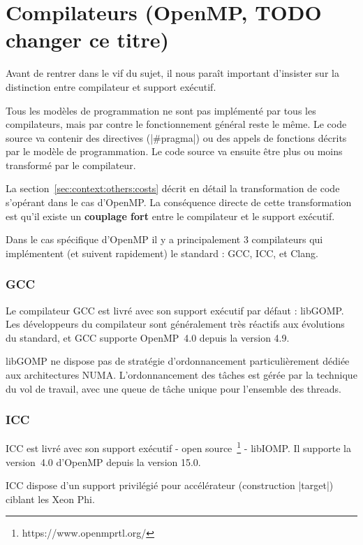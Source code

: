 \section{Compilateurs (OpenMP, TODO changer ce titre)}\label{sec:rw:compilers}


Avant de rentrer dans le vif du sujet, il nous paraît important d'insister sur la distinction entre compilateur et support exécutif.

Tous les modèles de programmation ne sont pas implémenté par tous les compilateurs, mais par contre le fonctionnement général reste le même.
Le code source va contenir des directives (|#pragma|) ou des appels de fonctions décrits par le modèle de programmation. Le code source va ensuite être plus ou moins transformé par le compilateur.

La section~\ref{sec:context:others:costs} décrit en détail la transformation de code s'opérant dans le cas d'OpenMP.
La conséquence directe de cette transformation est qu'il existe un \textbf{couplage fort} entre le compilateur et le support exécutif.

Dans le cas spécifique d'OpenMP il y a principalement 3 compilateurs qui implémentent (et suivent rapidement) le standard : GCC, ICC, et Clang.


\subsubsection{GCC}

Le compilateur GCC est livré avec son support exécutif par défaut : libGOMP.
Les développeurs du compilateur sont généralement très réactifs aux évolutions du standard, et GCC supporte OpenMP~4.0 depuis la version 4.9.

libGOMP ne dispose pas de stratégie d'ordonnancement particulièrement dédiée aux architectures NUMA.
L'ordonnancement des tâches est gérée par la technique du vol de travail, avec une queue de tâche unique pour l'ensemble des threads.



\subsubsection{ICC}


ICC est livré avec son support exécutif - open source~\footnote{https://www.openmprtl.org/} - libIOMP.
Il supporte la version~4.0 d'OpenMP depuis la version 15.0.

ICC dispose d'un support privilégié pour accélérateur (construction |target|) ciblant les Xeon Phi.


